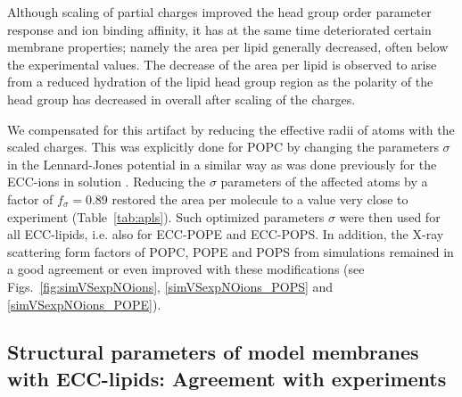 Although scaling of partial charges improved 
the head group order parameter response and ion binding affinity,
it has at the same time deteriorated certain membrane properties; 
namely the area per lipid generally decreased, often below the experimental values. 
The decrease of the area per lipid is observed to arise from a reduced hydration of the lipid head group region
as the polarity of the head group has decreased in overall after scaling of the charges. 

We compensated for this artifact
by reducing the effective radii of atoms with the scaled charges.
This was explicitly done for POPC by changing the parameters $\sigma$ in the Lennard-Jones potential 
in a similar way as was done previously for the ECC-ions in solution \cite{kohagen14,kohagen16,Pluharova2014}.
Reducing the $\sigma$ parameters of the affected atoms by a factor of $f_\sigma = 0.89$
restored the area per molecule to a value very close to experiment (Table~\ref{tab:apls}). 
Such optimized parameters $\sigma$ were then used for all ECC-lipids, i.e. also for ECC-POPE and ECC-POPS. 
In addition, the X-ray scattering form factors of POPC, POPE and POPS from simulations remained in a good agreement or even improved with these modifications 
(see Figs.~\ref{fig:simVSexpNOions}, \ref{simVSexpNOions_POPS} and \ref{simVSexpNOions_POPE}). 








\subsection{Structural parameters of model membranes with ECC-lipids: Agreement with experiments} 
 
